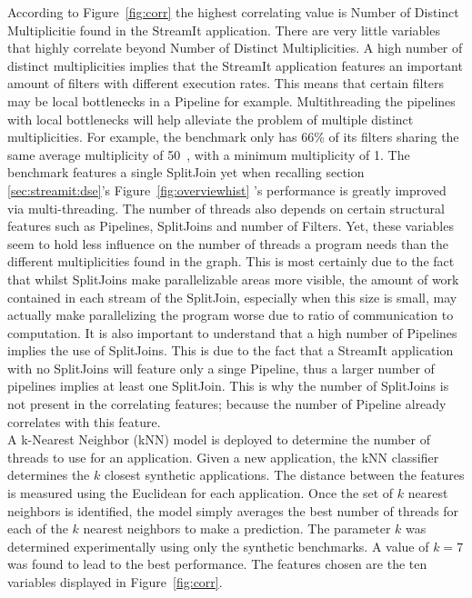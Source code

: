 According to Figure~\ref{fig:corr} the highest correlating value is Number of Distinct Multiplicitie found in the StreamIt application.
There are very little variables that highly correlate beyond Number of Distinct Multiplicities.
A high number of distinct multiplicities implies that the StreamIt application features an important amount of filters with different execution rates.
This means that certain filters may be local bottlenecks in a Pipeline for example.
Multithreading the pipelines with local bottlenecks will help alleviate the problem of multiple distinct multiplicities.
For example, the benchmark  only has 66\% of its filters sharing the same average multiplicity of 50~\cite{theis2010empericalcharstreamit}, with a minimum multiplicity of 1. 
The benchmark features a single SplitJoin yet when recalling section \ref{sec:streamit:dse}'s Figure~\ref{fig:overviewhist} 's performance is greatly improved via multi-threading.
The number of threads also depends on certain structural features such as Pipelines, SplitJoins and number of Filters.
Yet, these variables seem to hold less influence on the number of threads a program needs than the different multiplicities found in the graph.
This is most certainly due to the fact that whilst SplitJoins make parallelizable areas more visible, the amount of work contained in each stream of the SplitJoin, especially when this size is small, may actually make parallelizing the program worse due to ratio of communication to computation.
It is also important to understand that a high number of Pipelines implies the use of SplitJoins.
This is due to the fact that a StreamIt application with no SplitJoins will feature only a singe Pipeline, thus a larger number of pipelines implies at least one SplitJoin.
This is why the number of SplitJoins is not present in the correlating features; because the number of Pipeline already correlates with this feature.\\

A k-Nearest Neighbor (kNN) model is deployed to determine the number of threads to use for an application.
Given a new application, the kNN classifier determines the $k$ closest synthetic applications.
The distance between the features is measured using the Euclidean for each application.
Once the set of $k$ nearest neighbors is identified, the model simply averages the best number of threads for each of the $k$ nearest neighbors to make a prediction.
The parameter $k$ was determined experimentally using only the synthetic benchmarks.
A value of $k=7$ was found to lead to the best performance.
The features chosen are the ten variables displayed in Figure~\ref{fig:corr}.

